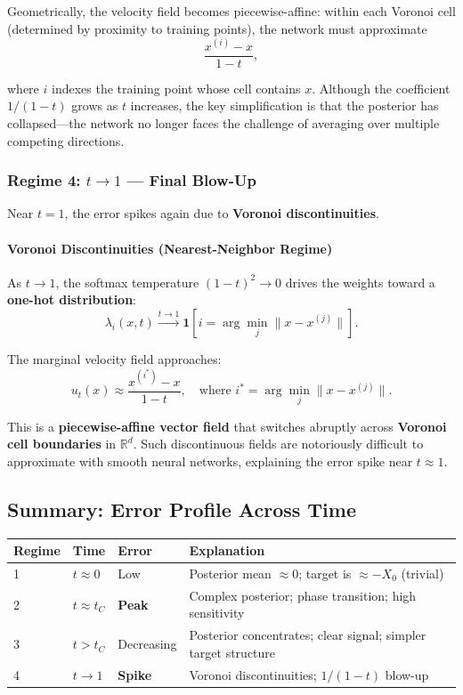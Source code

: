\documentclass[11pt]{article}
\begin{document}
Geometrically, the velocity field becomes piecewise-affine: within each Voronoi cell (determined by proximity to training points), the network must approximate
\begin{equation}
\frac{x^{(i)} - x}{1-t},
\end{equation}

where $i$ indexes the training point whose cell contains $x$. Although the coefficient $1/(1-t)$ grows as $t$ increases, the key simplification is that the posterior has collapsed---the network no longer faces the challenge of averaging over multiple competing directions.

\subsubsection{Regime 4: $t \to 1$ --- Final Blow-Up}
Near $t = 1$, the error spikes again due to \textbf{Voronoi discontinuities}.

\paragraph{Voronoi Discontinuities (Nearest-Neighbor Regime)}
As $t \to 1$, the softmax temperature $(1-t)^2 \to 0$ drives the weights toward a \textbf{one-hot distribution}:
\begin{equation}
\lambda_i(x,t) \xrightarrow{t \to 1} \mathbf{1}\left[i = \arg\min_j \|x - x^{(j)}\|\right].
\end{equation}

The marginal velocity field approaches:
\begin{equation}
u_t(x) \approx \frac{x^{(i^*)} - x}{1-t}, \quad \text{where } i^* = \arg\min_j \|x - x^{(j)}\|.
\end{equation}

This is a \textbf{piecewise-affine vector field} that switches abruptly across \textbf{Voronoi cell boundaries} in $\mathbb{R}^d$. Such discontinuous fields are notoriously difficult to approximate with smooth neural networks, explaining the error spike near $t \approx 1$.

\subsection{Summary: Error Profile Across Time}
\begin{center}
\begin{tabular}{@{}llll@{}}
\toprule
Regime & Time & Error & Explanation \\ \midrule
1 & $t \approx 0$ & Low & Posterior mean $\approx 0$; target is $\approx -X_0$ (trivial) \\
2 & $t \approx t_C$ & \textbf{Peak} & Complex posterior; phase transition; high sensitivity \\
3 & $t > t_C$ & Decreasing & Posterior concentrates; clear signal; simpler target structure \\
4 & $t \to 1$ & \textbf{Spike} & Voronoi discontinuities; $1/(1-t)$ blow-up \\ \bottomrule
\end{tabular}
\end{center}
\end{document}
